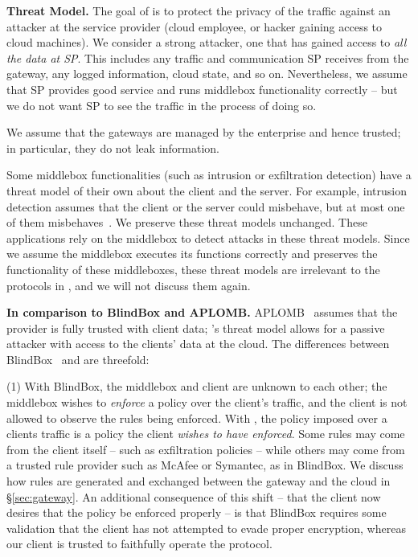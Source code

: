 {\bf Threat Model.}
The goal of \sys is to protect the privacy of the traffic against an attacker at the service provider  
(cloud employee, or hacker gaining access to cloud machines). 
We consider a strong  attacker, one that has gained access to {\em all the data at SP}.
This includes any traffic and communication SP receives from the 
gateway, any logged information, cloud state, and so on. Nevertheless, we assume that 
SP provides good service and runs middlebox functionality correctly -- but we do not want SP to 
see the traffic in the process of doing so.  

We assume that the gateways are managed by the enterprise and hence trusted; in particular,  they do not leak information.


Some middlebox functionalities (such as intrusion or exfiltration detection) have a threat model
of their own about the client and the server. For example, intrusion detection assumes that 
the client or the server could misbehave, but at most one of them misbehaves~\cite{Bro}.  
We preserve these threat models unchanged. These applications rely
on the middlebox to detect attacks in these threat models. Since we assume the middlebox executes
its functions correctly and \sys preserves the functionality of these middleboxes, 
these threat models are irrelevant to the protocols in \sys, and we will not discuss them again. 

\textbf{In comparison to BlindBox and APLOMB.}
APLOMB~\cite{aplomb} assumes that the provider is fully trusted with client data; \sys's threat model allows for a passive attacker with access to the clients' data at the cloud.
The differences between BlindBox~\cite{blindbox} and \sys are threefold:

%
\noindent(1) With BlindBox, the middlebox and client are unknown to each other; the middlebox wishes to {\it enforce} a policy over the client's traffic, and the client is not allowed to observe the rules being enforced. With \sys, the policy imposed over a clients traffic is a policy the client {\it wishes to have enforced}. 
Some rules may come from the client itself -- such as exfiltration policies -- while others may come from a trusted rule provider such as McAfee or Symantec, as in BlindBox. We discuss how rules are generated and exchanged between the gateway and the cloud in \S\ref{sec:gateway}.
An additional consequence of this shift -- that the client now desires that the policy be enforced properly -- is that BlindBox requires some validation that the client has not attempted to evade proper encryption, whereas our client is trusted to faithfully operate the protocol.
%

